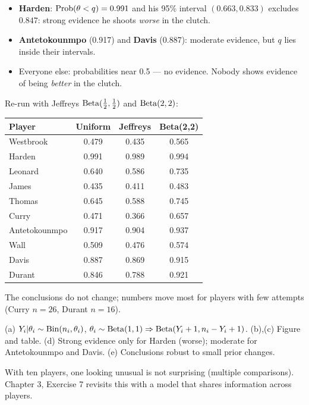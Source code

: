 \documentclass[11pt]{article}
\begin{document}
\begin{itemize}
\item \textbf{Harden}: $\mathrm{Prob}(\theta<q)=0.991$ and his 95\% interval $(0.663,0.833)$ excludes $0.847$: strong evidence he shoots \emph{worse} in the clutch.
\item \textbf{Antetokounmpo} (0.917) and \textbf{Davis} (0.887): moderate evidence, but $q$ lies inside their intervals.
\item Everyone else: probabilities near 0.5 --- no evidence. Nobody shows evidence of being \emph{better} in the clutch.
\end{itemize}

 Re-run with Jeffreys $\mathrm{Beta}(\frac12,\frac12)$ and $\mathrm{Beta}(2,2)$:
\begin{center}
\small
\begin{tabular}{lccc}\toprule
Player & Uniform & Jeffreys & Beta(2,2)\\\midrule
Westbrook & 0.479 & 0.435 & 0.565\\
Harden & 0.991 & 0.989 & 0.994\\
Leonard & 0.640 & 0.586 & 0.735\\
James & 0.435 & 0.411 & 0.483\\
Thomas & 0.645 & 0.588 & 0.745\\
Curry & 0.471 & 0.366 & 0.657\\
Antetokounmpo & 0.917 & 0.904 & 0.937\\
Wall & 0.509 & 0.476 & 0.574\\
Davis & 0.887 & 0.869 & 0.915\\
Durant & 0.846 & 0.788 & 0.921\\\bottomrule
\end{tabular}
\end{center}
The conclusions do not change; numbers move most for players with few attempts (Curry $n=26$, Durant $n=16$).

\begin{answer}
(a) $Y_i|\theta_i\sim\mathrm{Bin}(n_i,\theta_i)$, $\theta_i\sim\mathrm{Beta}(1,1)\Rightarrow\mathrm{Beta}(Y_i+1,n_i-Y_i+1)$. (b),(c) Figure and table. (d) Strong evidence only for Harden (worse); moderate for Antetokounmpo and Davis. (e) Conclusions robust to small prior changes.
\end{answer}

\begin{takeaway}
With ten players, one looking unusual is not surprising (multiple comparisons). Chapter 3, Exercise 7 revisits this with a model that shares information across players.
\end{takeaway}
\end{document}
